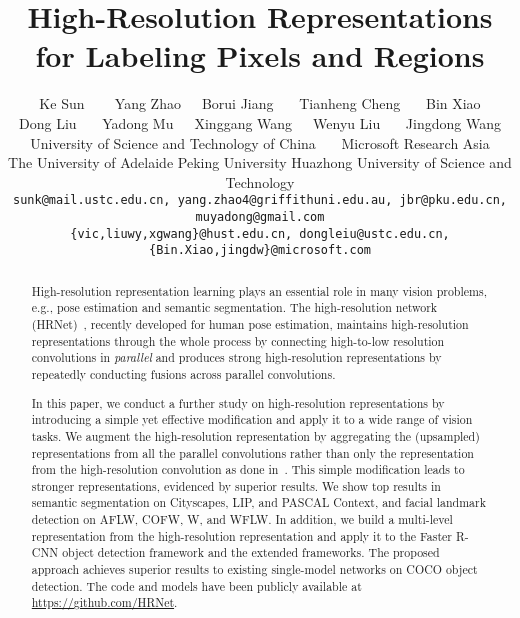 \documentclass[10pt,twocolumn,letterpaper]{article}
\newcommand*\samethanks[1][\value{footnote}]{\footnotemark[#1]}
\begin{document}
\title{High-Resolution Representations
for Labeling Pixels and Regions}

\author{Ke Sun ~~~ Yang Zhao\samethanks[1]~~~Borui Jiang\samethanks[1] ~~~ Tianheng Cheng\samethanks[1]
	~~~ Bin Xiao \\ Dong Liu~~~ Yadong Mu~~~Xinggang Wang~~~Wenyu Liu~~~ Jingdong Wang\\
	University of Science and Technology of China~~~ Microsoft Research Asia\\The University of Adelaide Peking University Huazhong University of Science and Technology\\	
	{\tt\small sunk@mail.ustc.edu.cn, yang.zhao4@griffithuni.edu.au, jbr@pku.edu.cn, muyadong@gmail.com}\\ {\tt\small \{vic,liuwy,xgwang\}@hust.edu.cn, dongleiu@ustc.edu.cn, \{Bin.Xiao,jingdw\}@microsoft.com}
}

\maketitle
\thispagestyle{empty}
\begin{abstract}
High-resolution representation learning
plays an essential role in many vision problems,
e.g., pose estimation and semantic segmentation.
The high-resolution network (HRNet)~\cite{SunXLW19},
recently developed for human pose estimation,
maintains high-resolution representations
through the whole process
by connecting high-to-low resolution convolutions in \emph{parallel}
and produces strong high-resolution representations
by repeatedly conducting fusions across parallel convolutions.

In this paper, we conduct a further study
on high-resolution representations
by introducing a simple yet effective modification
and apply it to a wide range of vision tasks.
We augment the high-resolution representation
by aggregating the (upsampled) representations
from all the parallel convolutions
rather than only the representation
from the high-resolution convolution as done in~\cite{SunXLW19}.
This simple modification leads to stronger representations,
evidenced by superior results.
We show top results
in semantic segmentation
on Cityscapes, LIP,
and PASCAL Context,
and facial landmark detection on AFLW, COFW, W, and WFLW.
In addition,
we build a multi-level representation
from the high-resolution representation
and apply it to the Faster R-CNN object detection framework and the extended frameworks.
The proposed approach achieves superior results
to existing single-model networks on COCO object detection.
The code and models have been publicly available at \url{https://github.com/HRNet}.
\end{abstract}
\end{document}

